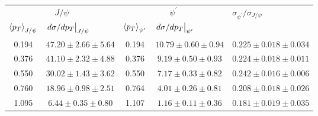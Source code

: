 \begin{tabular}{cc|cc|c}
\hline
\multicolumn{2}{c|}{$J/\psi$} &
  \multicolumn{2}{c|}{$\psi^{\prime}$} &
  \multicolumn{1}{l}{\multirow{2}{*}{$\sigma_{\psi^\prime}/\sigma_{J/\psi}$}} \\ \cline{1-4}
\multicolumn{1}{l}{$\expval{p_T}_{J/\psi}$} &
  \multicolumn{1}{l|}{$\eval{d\sigma/dp_T}_{J/\psi}$} &
  \multicolumn{1}{l}{$\expval{p_T}_{\psi^\prime}$} &
  \multicolumn{1}{l|}{$\eval{d\sigma/dp_T}_{\psi^\prime}$} &
  \multicolumn{1}{l}{} \\ \hline
\multicolumn{1}{c|}{0.194} &
  $47.20\pm2.66\pm5.64$ &
  \multicolumn{1}{c|}{0.194} &
  $10.79\pm0.60\pm0.94$ &
  $0.225\pm0.018\pm0.034$ \\
\multicolumn{1}{c|}{0.376} &
  $41.10\pm2.32\pm4.88$ &
  \multicolumn{1}{c|}{0.376} &
  $9.19\pm0.50\pm0.93$ &
  $0.224\pm0.018\pm0.011$ \\
\multicolumn{1}{c|}{0.550} &
  $30.02\pm1.43\pm3.62$ &
  \multicolumn{1}{c|}{0.550} &
  $7.17\pm0.33\pm0.82$ &
  $0.242\pm0.016\pm0.006$ \\
\multicolumn{1}{c|}{0.760} &
  $18.96\pm0.98\pm2.51$ &
  \multicolumn{1}{c|}{0.764} &
  $4.01\pm0.26\pm0.81$ &
  $0.208\pm0.018\pm0.026$ \\
\multicolumn{1}{c|}{1.095} &
  $6.44\pm0.35\pm0.80$ &
  \multicolumn{1}{c|}{1.107} &
  $1.16\pm0.11\pm0.36$ &
  $0.181\pm0.019\pm0.035$ \\ \hline
\end{tabular}
